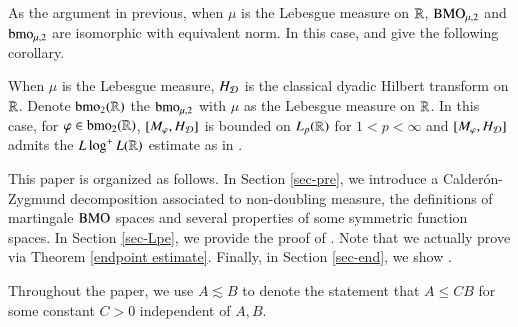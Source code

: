\documentclass[leqno]{amsart}
\begin{document}
As the argument in previous, when $\mu$ is the Lebesgue measure on ${\mathbb R}$, ${\rm BMO}_{\mu,2}$ and ${\rm bmo}_{\mu,2}$ are isomorphic with equivalent norm. In this case,  and  give the following corollary.

\begin{corollary}
When $\mu$ is the Lebesgue measure, $H_{{\mathcal D}}$ is the classical dyadic Hilbert transform on ${\mathbb R}$. 
Denote ${\rm bmo}_{2}({\mathbb R})$ the ${\rm bmo}_{\mu,2}$ with $\mu$ as the Lebesgue measure on ${\mathbb R}$. 
In this case, for $\varphi\in{\rm bmo}_{2}({\mathbb R})$, $[M_{\varphi},H_{{\mathcal D}}]$ is bounded on $L_{p}({\mathbb R})$  for  $1<p<\infty$ and $[M_{\varphi},H_{{\mathcal D}}]$ admits the $L\log^{+}L({\mathbb R})$ estimate as in .
\end{corollary}


This paper is organized as follows. In Section \ref{sec-pre}, we introduce a  Calder\'{o}n-Zygmund decomposition associated to non-doubling measure, the definitions of martingale ${\rm BMO}$ spaces and several properties of some symmetric function spaces. In Section \ref{sec-Lpe}, we provide the proof of . Note that we actually prove  via Theorem \ref{endpoint estimate}. Finally, in Section \ref{sec-end}, we show . 

Throughout the paper, we use $A\lesssim B$ to denote the statement that $A\leq CB$ for some constant $C>0$ independent of $A,B$.


%
\end{document}
